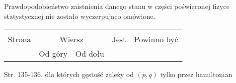 \documentclass[a4paper,11pt]{article}
\begin{document}
\vspace{\spaceFour}



Prawdopodobieństwo zaistnienia danego stanu w części poświęconej fizyce statystycznej
nie zostało wyczerpująco omówione.



















\begin{center}

  \begin{tabular}{|c|c|c|c|c|}
    \hline
    & \multicolumn{2}{c|}{} & & \\
    Strona & \multicolumn{2}{c|}{Wiersz} & Jest
                              & Powinno być \\ \cline{2-3}
    & Od góry & Od dołu & & \\
    \hline
    \hline
  \end{tabular}

\end{center}



Str. 135-136. dla których gęstość zależy od $( p, q )$ tylko przez hamiltonian \\

\vspace{\spaceTwo}












{}






\end{document}
